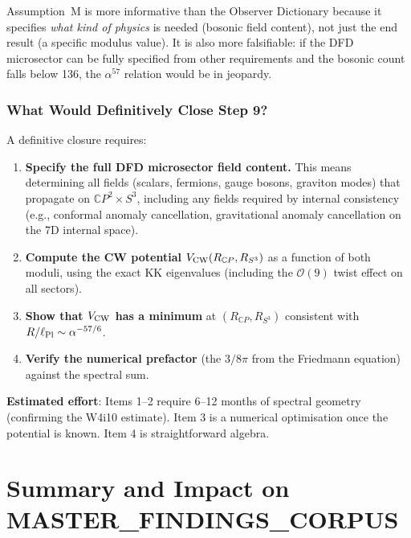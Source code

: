 \documentclass[11pt,a4paper]{article}
\newcommand{\CP}{\mathbb{C}P}
\newcommand{\lPl}{\ell_{\rm Pl}}
\newcommand{\alphafine}{\alpha}
\begin{document}
Assumption~M is more informative than the Observer Dictionary
because it specifies \emph{what kind of physics} is needed
(bosonic field content), not just the end result (a specific
modulus value). It is also more falsifiable: if the DFD
microsector can be fully specified from other requirements
and the bosonic count falls below 136, the $\alpha^{57}$
relation would be in jeopardy.


\section{What Would Definitively Close Step 9?}
\label{sec:close}

A definitive closure requires:

\begin{enumerate}
\item \textbf{Specify the full DFD microsector field content.}
  This means determining all fields (scalars, fermions, gauge bosons,
  graviton modes) that propagate on $\CP^2 \times S^3$, including
  any fields required by internal consistency (e.g., conformal
  anomaly cancellation, gravitational anomaly cancellation on the
  7D internal space).

\item \textbf{Compute the CW potential $V_{\rm CW}(R_{\CP}, R_{S^3})$}
  as a function of both moduli, using the exact KK eigenvalues
  (including the $\mathcal{O}(9)$ twist effect on all sectors).

\item \textbf{Show that $V_{\rm CW}$ has a minimum} at
  $(R_{\CP}, R_{S^3})$ consistent with $R/\lPl \sim \alphafine^{-57/6}$.

\item \textbf{Verify the numerical prefactor} (the $3/8\pi$ from
  the Friedmann equation) against the spectral sum.
\end{enumerate}

\textbf{Estimated effort}: Items 1--2 require 6--12 months of
spectral geometry (confirming the W4i10 estimate). Item 3 is a
numerical optimisation once the potential is known. Item 4 is
straightforward algebra.


\part{Summary and Impact on MASTER\_FINDINGS\_CORPUS}
\label{part:summary}
\end{document}
